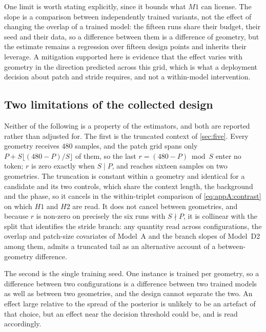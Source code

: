 One limit is worth stating explicitly, since it bounds what $M1$ can license. The slope is a comparison between independently trained variants, not the effect of changing the overlap of a trained model: the fifteen runs share their budget, their seed and their data, so a difference between them is a difference of geometry, but the estimate remains a regression over fifteen design points and inherits their leverage. A mitigation supported here is evidence that the effect varies with geometry in the direction predicted across this grid, which is what a deployment decision about patch and stride requires, and not a within-model intervention.

\subsection{Two limitations of the collected design}

Neither of the following is a property of the estimators, and both are reported rather than adjusted for. The first is the truncated context of \autoref{sec:five}. Every geometry receives $480$ samples, and the patch grid spans only $P+S\lfloor(480-P)/S\rfloor$ of them, so the last $r=(480-P)\bmod S$ enter no token; $r$ is zero exactly when $S \mid P$, and reaches sixteen samples on two geometries. The truncation is constant within a geometry and identical for a candidate and its two controls, which share the context length, the background and the phase, so it cancels in the within-triplet comparison of \autoref{eq:appA:contrast} on which $H1$ and $H2$ are read. It does not cancel between geometries, and because $r$ is non-zero on precisely the six runs with $S \nmid P$, it is collinear with the split that identifies the stride branch: any quantity read across configurations, the overlap and patch-size covariates of Model~A and the branch slopes of Model~D2 among them, admits a truncated tail as an alternative account of a between-geometry difference.

The second is the single training seed. One instance is trained per geometry, so a difference between two configurations is a difference between two trained models as well as between two geometries, and the design cannot separate the two. An effect large relative to the spread of the posterior is unlikely to be an artefact of that choice, but an effect near the decision threshold could be, and is read accordingly.

